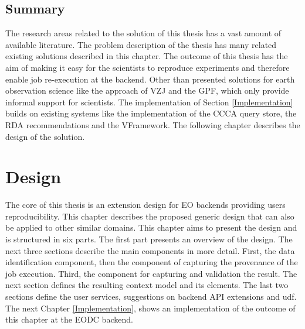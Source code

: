 \documentclass[draft,final]{vutinfth} %
\begin{document}
\section{Summary}

The research areas related to the solution of this thesis has a vast amount of available literature. The problem description of the thesis has many related existing solutions described in this chapter. The outcome of this thesis has the aim of making it easy for the scientists to reproduce experiments and therefore enable job re-execution at the backend. Other than presented solutions for earth observation science like the approach of VZJ and the GPF, which only provide informal support for scientists. The implementation of Section \ref{Implementation} builds on existing systems like the implementation of the CCCA query store, the RDA recommendations and the VFramework. The following chapter describes the design of the solution. 
 
\chapter{Design}\label{Design}


The core of this thesis is an extension design for EO backends providing users reproducibility. This chapter describes the proposed generic design that can also be applied to other similar domains. This chapter aims to present the design and is structured in six parts. The first part presents an overview of the design. The next three sections describe the main components in more detail. First,  the data identification component, then the component of capturing the provenance of the job execution. Third, the component for capturing and validation the result. The next section defines the resulting context model and its elements. The last two sections define the user services, suggestions on backend API extensions and \gls{udf}. The next Chapter \ref{Implementation}, shows an implementation of the outcome of this chapter at the EODC backend. 
\end{document}
